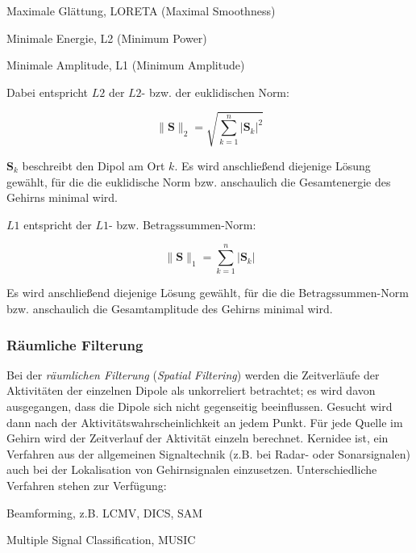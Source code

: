 \documentclass[doc,a4paper,12pt]{apa6}
\newcommand{\mx}[1]{\mathbf{#1}}
\begin{document}
\begin{compactitem}
\item Maximale Glättung, LORETA (Maximal Smoothness)
\item Minimale Energie, L2 (Minimum Power)
\item Minimale Amplitude, L1 (Minimum Amplitude)
\end{compactitem}

Dabei entspricht $L2$ der $L2$- bzw. der euklidischen Norm:

\begin{equation}
\|\mx{S}\|_2 = \sqrt{\sum_{k=1}^n |\mx{S}_k|^2}
\end{equation}

$\mx{S}_k$ beschreibt den Dipol am Ort $k$. Es wird anschließend diejenige Lösung gewählt, für die die euklidische Norm bzw. anschaulich die Gesamtenergie des Gehirns minimal wird.

$L1$ entspricht der $L1$- bzw. Betragssummen-Norm:

\begin{equation}
\|\mx{S}\|_1 = \sum_{k=1}^n |\mx{S}_k|
\end{equation}

Es wird anschließend diejenige Lösung gewählt, für die die Betragssummen-Norm bzw. anschaulich die Gesamtamplitude des Gehirns minimal wird.

\subsubsection{Räumliche Filterung}
\label{sec:beam}

Bei der \emph{räumlichen Filterung} (\emph{Spatial Filtering}) werden die Zeitverläufe der Aktivitäten der einzelnen Dipole als unkorreliert betrachtet; es wird davon ausgegangen, dass die Dipole sich nicht gegenseitig beeinflussen. Gesucht wird dann nach der Aktivitätswahrscheinlichkeit an jedem Punkt. Für jede Quelle im Gehirn wird der Zeitverlauf der Aktivität einzeln berechnet. Kernidee ist, ein Verfahren aus der allgemeinen Signaltechnik (z.B. bei Radar- oder Sonarsignalen) auch bei der Lokalisation von Gehirnsignalen einzusetzen. Unterschiedliche Verfahren stehen zur Verfügung:

\begin{compactitem}
\item Beamforming, z.B. LCMV, DICS, SAM
\item Multiple Signal Classification, MUSIC
\end{compactitem}
\end{document}
